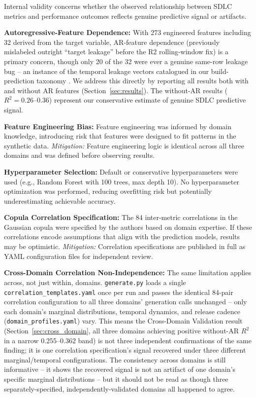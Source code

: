 \documentclass[technologies,article,submit,pdftex,moreauthors]{Definitions/mdpi}
\begin{document}
Internal validity concerns whether the observed relationship between
SDLC metrics and performance outcomes reflects genuine predictive signal
or artifacts.

\textbf{Autoregressive-Feature Dependence:} With 273 engineered features
including 32 derived from the target variable, AR-feature dependence
(previously mislabeled outright ``target leakage'' before the R2
rolling-window fix) is a primary concern, though only 20 of the 32 were
ever a genuine same-row leakage bug -- an instance of the temporal
leakage vectors catalogued in our build-prediction taxonomy
\cite{mishra2026leakage}. We address this directly by reporting all
results both with and without AR features (Section~\ref{sec:results}). The without-AR
results (\(R^2 = 0.26\)--\(0.36\)) represent our conservative estimate
of genuine SDLC predictive signal.

\textbf{Feature Engineering Bias:} Feature engineering was informed by
domain knowledge, introducing risk that features were designed to fit
patterns in the synthetic data. \emph{Mitigation:} Feature engineering
logic is identical across all three domains and was defined before
observing results.

\textbf{Hyperparameter Selection:} Default or conservative
hyperparameters were used (e.g., Random Forest with 100 trees, max depth
10). No hyperparameter optimization was performed, reducing overfitting
risk but potentially underestimating achievable accuracy.

\textbf{Copula Correlation Specification:} The 84 inter-metric
correlations in the Gaussian copula were specified by the authors based
on domain expertise. If these correlations encode assumptions that align
with the prediction models, results may be optimistic.
\emph{Mitigation:} Correlation specifications are published in full as
YAML configuration files for independent review.

\textbf{Cross-Domain Correlation Non-Independence:} The same limitation
applies across, not just within, domains. \texttt{generate.py} loads a
single \texttt{correlation\_templates.yaml} once per run and passes the
identical 84-pair correlation configuration to all three domains'
generation calls unchanged -- only each domain's marginal distributions,
temporal dynamics, and release cadence (\texttt{domain\_profiles.yaml})
vary. This means the Cross-Domain Validation result
(Section~\ref{sec:cross_domain}, all three domains achieving positive
without-AR \(R^2\) in a narrow 0.255--0.362 band) is not three
independent confirmations of the same finding; it is one correlation
specification's signal recovered under three different marginal/temporal
configurations. The consistency across domains is still informative --
it shows the recovered signal is not an artifact of one domain's
specific marginal distributions -- but it should not be read as though
three separately-specified, independently-validated domains all
happened to agree.
\end{document}
